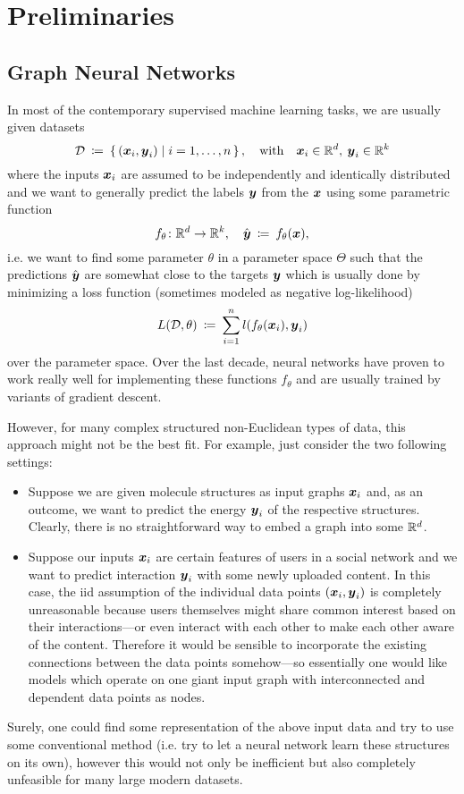 \section{Preliminaries}

\subsection{Graph Neural Networks}

In most of the contemporary supervised machine learning tasks, we are usually given 
datasets
\[ 
    \mathcal{D} \: \coloneqq \: 
    \left\{\, (\boldsymbol{x}_i, \boldsymbol{y}_i) \; \middle| \; i=1, \dots, n \,\right\}, 
    \quad \text{with} \quad \boldsymbol{x}_i \in \mathbb{R}^{d}, \: \boldsymbol{y}_i \in \mathbb{R}^k 
\]
where the inputs $\boldsymbol{x}_i$ are assumed to be independently and identically 
distributed and we want to generally predict the labels $\boldsymbol{y}$ from the $\boldsymbol{x}$ using
some parametric function
\[
    f_\theta \colon \mathbb{R}^d \to \mathbb{R}^k, \quad
    \hat{\boldsymbol{y}} \: \coloneqq \: f_\theta(\boldsymbol{x}),
\]
i.e. we want to find some parameter $\theta$ in a parameter space $\Theta$ such that
the predictions $\hat{\boldsymbol{y}}$ are somewhat close to the targets $\boldsymbol{y}$ which is usually
done by minimizing a loss function (sometimes modeled as negative log-likelihood)
\[
    L(\mathcal{D}, \theta) \: \coloneqq \: \sum_{i=1}^n l(f_\theta(\boldsymbol{x}_i), \boldsymbol{y}_i)
\]
over the parameter space. Over the last decade, neural networks have proven to work 
really well for implementing these functions $f_\theta$ and are usually trained by 
variants of gradient descent.

However, for many complex structured non-Euclidean types of data, this approach might 
not be the best fit. For example, just consider the two following settings:
\begin{itemize}
    \item Suppose we are given molecule structures as input graphs $\boldsymbol{x}_i$ and, as an 
          outcome, we want to predict the energy $\boldsymbol{y}_i$ of the respective structures. 
          Clearly, there is no straightforward way to embed a graph into some $\mathbb{R}^d$.
    \item Suppose our inputs $\boldsymbol{x}_i$ are certain features of users in a social network
          and we want to predict interaction $\boldsymbol{y}_i$ with some newly uploaded content. In this 
          case, the iid assumption of the individual data points $(\boldsymbol{x}_i, \boldsymbol{y}_i)$ is 
          completely unreasonable because users themselves might share common interest 
          based on their interactions---or even interact with each other to make each 
          other aware of the content. Therefore it would be sensible to incorporate the 
          existing connections between the data points somehow---so essentially one would 
          like models which operate on one giant input graph with interconnected and 
          dependent data points as nodes.
\end{itemize}
Surely, one could find some representation of the above input data and try to use some
conventional method (i.e. try to let a neural network learn these structures on its own),
however this would not only be inefficient but also completely unfeasible for many large 
modern datasets. 

